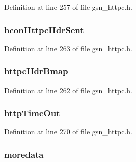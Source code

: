 Definition at line 257 of file gsn\_\-httpc.h.

\hypertarget{a00093_a5d6c4b9c75815c9cdac4984781c96e46}{
\subsubsection[{hconHttpcHdrSent}]{ {\bf hconHttpcHdrSent}}}
\label{a00093_a5d6c4b9c75815c9cdac4984781c96e46}


Definition at line 263 of file gsn\_\-httpc.h.

\hypertarget{a00093_ab135b0058d995a60e5d68bb6ae5f1cdb}{
\subsubsection[{httpcHdrBmap}]{ {\bf httpcHdrBmap}}}
\label{a00093_ab135b0058d995a60e5d68bb6ae5f1cdb}


Definition at line 262 of file gsn\_\-httpc.h.

\hypertarget{a00093_aa22363befcb31b7539f282109cf5a926}{
\subsubsection[{httpTimeOut}]{ {\bf httpTimeOut}}}
\label{a00093_aa22363befcb31b7539f282109cf5a926}


Definition at line 270 of file gsn\_\-httpc.h.

\hypertarget{a00093_a691b9a4f8694ea2cee930a97d5082533}{
\subsubsection[{moredata}]{ {\bf moredata}}}
\label{a00093_a691b9a4f8694ea2cee930a97d5082533}


